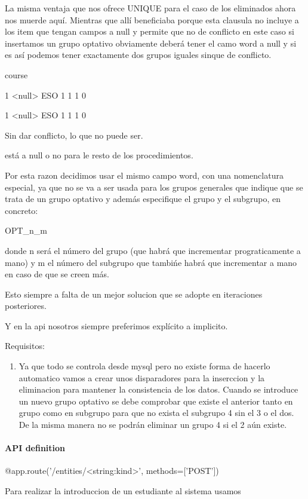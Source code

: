 \documentclass[oneside,english,titlepage]{scrbook}
\begin{document}
La misma ventaja que nos ofrece UNIQUE para el caso de los eliminados
ahora nos muerde aquí. Mientras que allí beneficiaba porque esta clausula
no incluye a los item que tengan campos a null y permite que no de
conflicto en este caso si insertamos un grupo optativo obviamente
deberá tener el camo word a null y si es así podemos tener exactamente
dos grupos iguales sinque de conflicto.

course

1 <null> ESO 1 1 1 0

1 <null> ESO 1 1 1 0

Sin dar conflicto, lo que no puede ser.



está a null o no para le resto de los procedimientos.

Por esta razon decidimos usar el mismo campo word, con una nomenclatura
especial, ya que no se va a ser usada para los grupos generales que
indique que se trata de un grupo optativo y además especifique el
grupo y el subgrupo, en concreto:

OPT\_n\_m

donde n será el número del grupo (que habrá que incrementar prograticamente
a mano) y m el número del subgrupo que tambi\'{n}e habrá que incrementar
a mano en caso de que se creen más.

Esto siempre a falta de un mejor solucion que se adopte en iteraciones
posteriores.

Y en la api nosotros siempre preferimos explícito a implicito.

Requisitos:
\begin{enumerate}
\item Ya que todo se controla desde mysql pero no existe forma de hacerlo
automatico vamos a crear unos disparadores para la inserccion y la
eliminacion para mantener la consistencia de los datos. Cuando se
introduce un nuevo grupo optativo se debe comprobar que existe el
anterior tanto en grupo como en subgrupo para que no exista el subgrupo
4 sin el 3 o el dos. De la misma manera no se podrán eliminar un grupo
4 si el 2 aún existe.
\end{enumerate}

\paragraph{API definition}

@app.route('/entities/<string:kind>', methods={[}'POST'{]})

Para realizar la introduccion de un estudiante al sistema usamos
\end{document}
